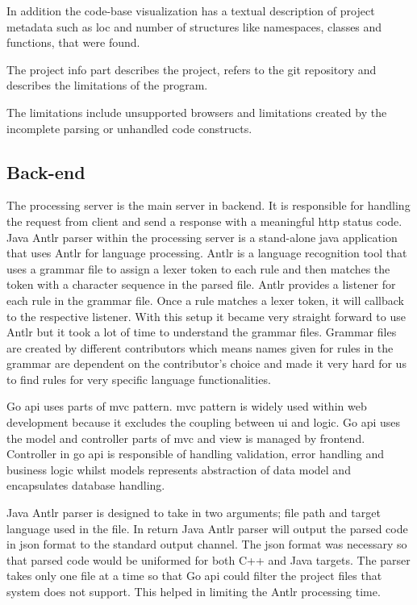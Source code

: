 In addition the code-base visualization has a textual description of project metadata such as \gls{loc} and number of structures like \glspl{namespace}, classes and functions, that were found.

The project info part describes the project, refers to the \gls{git} repository  and describes the limitations of the program.

The limitations include unsupported browsers and limitations created by the incomplete parsing or unhandled code constructs.

\subsection{Back-end}
\label{sec:technicalBackEnd}
The processing server is the main server in \gls{backend}. It is responsible for handling the request from \gls{client} and send a response with a meaningful \gls{http} status code. Java \gls{Antlr} parser within the processing server is a stand-alone java application that uses \gls{Antlr} for language processing. \gls{Antlr} is a language recognition tool that uses a grammar file to assign a lexer token to each rule and then matches the token with a character sequence in the parsed file. \gls{Antlr} provides a listener for each rule in the grammar file. Once a rule matches a lexer token, it will callback to the respective listener. With this setup it became very straight forward to use \gls{Antlr} but it took a lot of time to understand the grammar files. Grammar files are created by different contributors which means names given for rules in the grammar are dependent on the contributor's choice and made it very hard for us to find rules for very specific language functionalities.

Go \gls{api} uses parts of \gls{mvc} pattern. \gls{mvc} pattern is widely used within web development because it excludes the coupling between \gls{ui} and logic. Go \gls{api} uses the model and controller parts of \gls{mvc} and view is managed by \gls{frontend}. Controller in go \gls{api} is responsible of handling validation, error handling and business logic whilst models represents abstraction of data model and encapsulates database handling.

Java \gls{Antlr} parser is designed to take in two arguments; file path and target language used in the file. In return Java \gls{Antlr} parser will output the parsed code in \gls{json} format to the standard output channel. The \gls{json} format was necessary so that parsed code would be uniformed for both C++ and Java targets. The parser takes only one file at a time so that Go \gls{api} could filter the project files that system does not support. This helped in limiting the \gls{Antlr} processing time.

